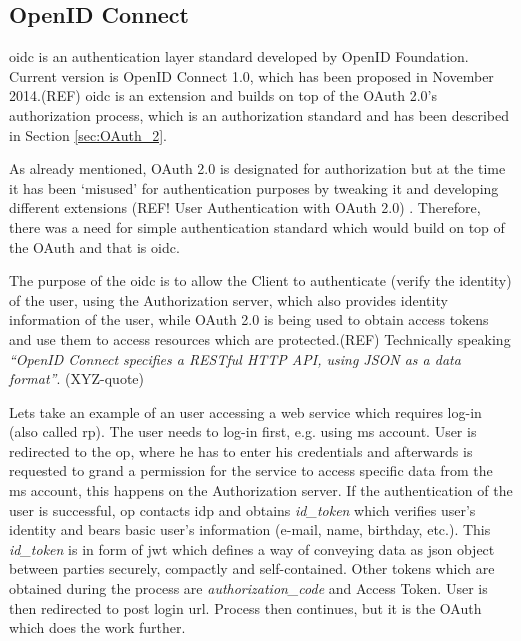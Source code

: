 \subsection{OpenID Connect}

\acrfull{oidc} is an authentication layer standard developed by OpenID Foundation. Current version is OpenID Connect 1.0, which has been proposed in November 2014.(REF) \acrshort{oidc} is an extension and builds on top of the OAuth 2.0’s authorization process, which is an authorization standard and has been described in Section \ref{sec:OAuth_2}. 

As already mentioned, OAuth 2.0 is designated for authorization but at the time it has been ‘misused’ for authentication purposes by tweaking it and developing different extensions (REF! User Authentication with OAuth 2.0) . Therefore, there was a need for simple authentication standard which would build on top of the OAuth and that is \acrshort{oidc}.

The purpose of the \acrshort{oidc} is to allow the Client to authenticate (verify the identity) of the user, using the Authorization server, which also provides identity information of the user, while OAuth 2.0 is being used to obtain access tokens and use them to access resources which are protected.(REF) Technically speaking \textit{“OpenID Connect specifies a RESTful HTTP API, using JSON as a data format”}.  (XYZ-quote)

Lets take an example of an user accessing a web service which requires log-in (also called \acrfull{rp}). The user needs to log-in first, e.g. using \acrfull{ms} account. User is redirected to the \acrfull{op}, where he has to enter his credentials and afterwards is requested to grand a permission for the service to access specific data from the \acrshort{ms} account, this happens on the Authorization server. If the authentication of the user is successful, \acrshort{op} contacts \acrfull{idp} and obtains \textit{id\_token} which verifies user’s identity and bears basic user’s information (e-mail, name, birthday, etc.). This \textit{id\_token} is in form of \acrfull{jwt} which defines a way of conveying data as \acrshort{json} object between parties securely, compactly and self-contained. Other tokens which are obtained during the process are \textit{authorization\_code} and Access Token. User is then redirected to post login \acrshort{url}. Process then continues, but it is the OAuth which does the work further.